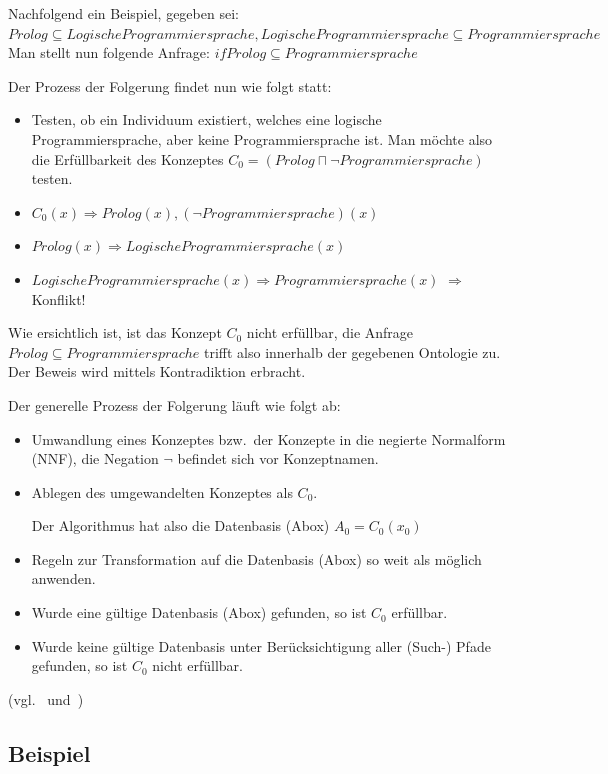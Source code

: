Nachfolgend ein Beispiel, gegeben sei:
$ Prolog \subseteq LogischeProgrammiersprache, LogischeProgrammiersprache \subseteq Programmiersprache $
Man stellt nun folgende Anfrage:
$ if Prolog \subseteq Programmiersprache $

Der Prozess der Folgerung findet nun wie folgt statt:
\begin{itemize}
    \item Testen, ob ein Individuum existiert, welches eine logische Programmiersprache, aber keine Programmiersprache ist. Man möchte also die Erfüllbarkeit des Konzeptes $ C_0 = (Prolog \sqcap \neg Programmiersprache) $ testen.
    \item $ C_0(x) \Rightarrow Prolog(x), (\neg Programmiersprache)(x) $
    \item $ Prolog(x) \Rightarrow LogischeProgrammiersprache(x) $
    \item $ LogischeProgrammiersprache(x) \Rightarrow Programmiersprache(x) $
        $ \Rightarrow $ Konflikt!
\end{itemize}
Wie ersichtlich ist, ist das Konzept $ C_0 $ nicht erfüllbar, die Anfrage $ Prolog \subseteq Programmiersprache $ trifft also innerhalb der gegebenen Ontologie zu. Der Beweis wird mittels Kontradiktion erbracht.

Der generelle Prozess der Folgerung läuft wie folgt ab:
\begin{itemize}
    \item Umwandlung eines Konzeptes bzw.\ der Konzepte in die negierte Normalform (NNF), die Negation $ \neg $ befindet sich vor Konzeptnamen.
    \item Ablegen des umgewandelten Konzeptes als $ C_0 $.

        Der Algorithmus hat also die Datenbasis (Abox) $ A_0 = {C_0(x_0)} $
    \item Regeln zur Transformation auf die Datenbasis (Abox) so weit als möglich anwenden.
    \item Wurde eine gültige Datenbasis (Abox) gefunden, so ist $ C_0 $ erfüllbar.
    \item Wurde keine gültige Datenbasis unter Berücksichtigung aller (Such-) Pfade gefunden, so ist $ C_0 $ nicht erfüllbar.
\end{itemize} (vgl.~\cite{horrocks2002} und~\cite{horrocks2005})



\subsection{Beispiel}
\label{subsec:inferenz_beispiel}

